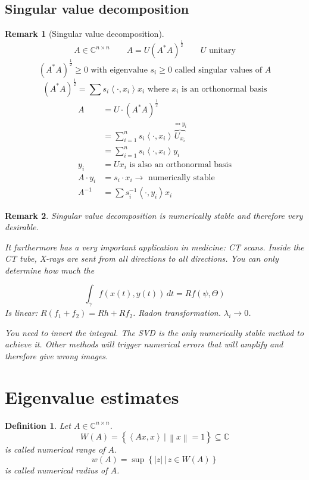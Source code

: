 \documentclass{article}
\newtheorem{definition}{Definition}  \numberwithin{definition}{section}
\newtheorem{remark}{Remark}  \numberwithin{remark}{section}
\newcommand{\setdef}[2]{\left\{\left.#1\,\right|\,#2\right\}}
\newcommand{\angel}[1]{\left\langle#1\right\rangle}
\newcommand{\norm}[1]{\left\|#1\right\|}
\newcommand{\card}[1]{\left|#1\right|}
\begin{document}
\subsection{Singular value decomposition}

\begin{remark}[Singular value decomposition]
  \[ A \in \mathbb C^{n \times n} \qquad A = U (A^* A)^{\frac12} \qquad U \text{ unitary} \]
  \[ (A^* A)^{\frac12} \geq 0 \text{ with eigenvalue } s_i \geq 0 \text{ called singular values of } A \]
  \[ (A^* A)^{\frac12} = \sum s_i \angel{\cdot, x_i} x_i \text{ where } x_i \text{ is an orthonormal basis} \]
  \begin{align*}
    A &= U \cdot (A^* A)^{\frac12} \\
      &= \sum_{i=1}^n s_i \angel{\cdot, x_i} \overbrace{U_{x_i}}^{\eqqcolon y_i} \\
      &= \sum_{i=1}^n s_i \angel{\cdot, x_i} y_i \\
    y_i &= U x_i \text{ is also an orthonormal basis} \\
    A \cdot y_i &= s_i \cdot x_i \to \text{ numerically stable} \\
    A^{-1} &= \sum s^{-1}_i \angel{\cdot, y_i} x_i
  \end{align*}
\end{remark}

\begin{remark}
  Singular value decomposition is numerically stable and therefore very desirable.

  It furthermore has a very important application in medicine: CT scans.
  Inside the CT tube, X-rays are sent from all directions to all directions.
  You can only determine how much the 

  \[ \int_{\gamma} f(x(t), y(t)) \,dt = Rf(\psi, \Theta) \]
  Is linear: $R(f_1 + f_2) = Rh + Rf_2$.
  Radon transformation. $\lambda_i \to 0$.

  You need to invert the integral. The SVD is the only numerically stable method to achieve it. Other methods will trigger numerical errors that will amplify and therefore give wrong images.
\end{remark}

\section{Eigenvalue estimates} %

\begin{definition} %
  Let $A \in \mathbb C^{n \times n}$.
  \[ W(A) = \setdef{\angel{Ax, x}}{\norm{x} = 1} \subseteq \mathbb C \]
  is called \emph{numerical range of $A$}.
  \[ w(A) = \sup\setdef{\card{z}}{z \in W(A)} \]
  is called \emph{numerical radius of $A$}.
\end{definition}
\end{document}
